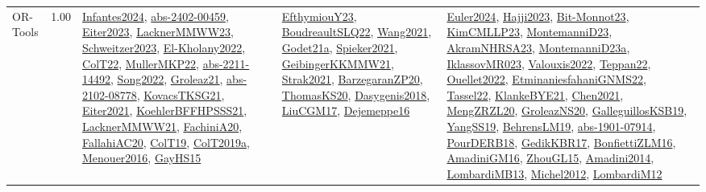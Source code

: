 {\begin{longtable}{p{3cm}r>{\raggedright\arraybackslash}p{6cm}>{\raggedright\arraybackslash}p{6cm}>{\raggedright\arraybackslash}p{8cm}}
\index{OR-Tools}\index{CPSystems!OR-Tools}OR-Tools &  1.00 & \hyperref[detail:Infantes2024]{Infantes2024}, \hyperref[detail:abs-2402-00459]{abs-2402-00459}, \hyperref[detail:Eiter2023]{Eiter2023}, \hyperref[detail:LacknerMMWW23]{LacknerMMWW23}, \hyperref[detail:Schweitzer2023]{Schweitzer2023}, \hyperref[detail:El-Kholany2022]{El-Kholany2022}, \hyperref[detail:ColT22]{ColT22}, \hyperref[detail:MullerMKP22]{MullerMKP22}, \hyperref[detail:abs-2211-14492]{abs-2211-14492}, \hyperref[detail:Song2022]{Song2022}, \hyperref[detail:Groleaz21]{Groleaz21}, \hyperref[detail:abs-2102-08778]{abs-2102-08778}, \hyperref[detail:KovacsTKSG21]{KovacsTKSG21}, \hyperref[detail:Eiter2021]{Eiter2021}, \hyperref[detail:KoehlerBFFHPSSS21]{KoehlerBFFHPSSS21}, \hyperref[detail:LacknerMMWW21]{LacknerMMWW21}, \hyperref[detail:FachiniA20]{FachiniA20}, \hyperref[detail:FallahiAC20]{FallahiAC20}, \hyperref[detail:ColT19]{ColT19}, \hyperref[detail:ColT2019a]{ColT2019a}, \hyperref[detail:Menouer2016]{Menouer2016}, \hyperref[detail:GayHS15]{GayHS15} & \hyperref[detail:EfthymiouY23]{EfthymiouY23}, \hyperref[detail:BoudreaultSLQ22]{BoudreaultSLQ22}, \hyperref[detail:Wang2021]{Wang2021}, \hyperref[detail:Godet21a]{Godet21a}, \hyperref[detail:Spieker2021]{Spieker2021}, \hyperref[detail:GeibingerKKMMW21]{GeibingerKKMMW21}, \hyperref[detail:Strak2021]{Strak2021}, \hyperref[detail:BarzegaranZP20]{BarzegaranZP20}, \hyperref[detail:ThomasKS20]{ThomasKS20}, \hyperref[detail:Dasygenis2018]{Dasygenis2018}, \hyperref[detail:LiuCGM17]{LiuCGM17}, \hyperref[detail:Dejemeppe16]{Dejemeppe16} & \hyperref[detail:Euler2024]{Euler2024}, \hyperref[detail:Hajji2023]{Hajji2023}, \hyperref[detail:Bit-Monnot23]{Bit-Monnot23}, \hyperref[detail:KimCMLLP23]{KimCMLLP23}, \hyperref[detail:MontemanniD23]{MontemanniD23}, \hyperref[detail:AkramNHRSA23]{AkramNHRSA23}, \hyperref[detail:MontemanniD23a]{MontemanniD23a}, \hyperref[detail:IklassovMR023]{IklassovMR023}, \hyperref[detail:Valouxis2022]{Valouxis2022}, \hyperref[detail:Teppan22]{Teppan22}, \hyperref[detail:Ouellet2022]{Ouellet2022}, \hyperref[detail:EtminaniesfahaniGNMS22]{EtminaniesfahaniGNMS22}, \hyperref[detail:Tassel22]{Tassel22}, \hyperref[detail:KlankeBYE21]{KlankeBYE21}, \hyperref[detail:Chen2021]{Chen2021}, \hyperref[detail:MengZRZL20]{MengZRZL20}, \hyperref[detail:GroleazNS20]{GroleazNS20}, \hyperref[detail:GalleguillosKSB19]{GalleguillosKSB19}, \hyperref[detail:YangSS19]{YangSS19}, \hyperref[detail:BehrensLM19]{BehrensLM19}, \hyperref[detail:abs-1901-07914]{abs-1901-07914}, \hyperref[detail:PourDERB18]{PourDERB18}, \hyperref[detail:GedikKBR17]{GedikKBR17}, \hyperref[detail:BonfiettiZLM16]{BonfiettiZLM16}, \hyperref[detail:AmadiniGM16]{AmadiniGM16}, \hyperref[detail:ZhouGL15]{ZhouGL15}, \hyperref[detail:Amadini2014]{Amadini2014}, \hyperref[detail:LombardiMB13]{LombardiMB13}, \hyperref[detail:Michel2012]{Michel2012}, \hyperref[detail:LombardiM12]{LombardiM12}\\

\end{longtable}}
